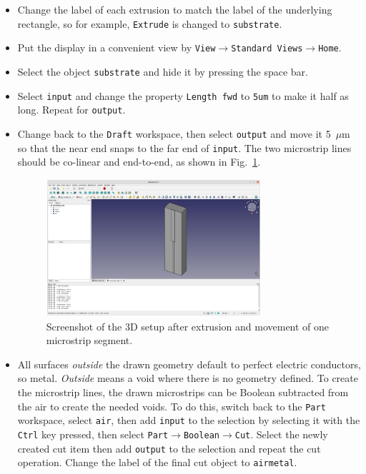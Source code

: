 \documentclass[titlepage]{article}
\renewcommand\_{\textunderscore\linebreak[1]}
\begin{document}
\begin{itemize}
\item Change the label of each extrusion to match the label of the underlying rectangle, so for example, \texttt{Extrude} is changed to \texttt{substrate}.
\item Put the display in a convenient view by \texttt{View}$\rightarrow$\texttt{Standard Views}$\rightarrow$\texttt{Home}.
\item Select the object \texttt{substrate} and hide it by pressing the space bar.
\item Select \texttt{input} and change the property \texttt{Length fwd} to \texttt{5um} to make it half as long.  Repeat for \texttt{output}.
\item Change back to the \texttt{Draft} workspace, then select \texttt{output} and move it 5~$\mu$m so that the near end snaps to the far end of \texttt{input}.  The two microstrip lines should be co-linear and end-to-end, as shown in Fig.~\ref{fig:microstrip_extrusion}.
\begin{figure}
  \centering
  \includegraphics[width=0.75\textwidth]{../tutorials/OpenParEM3D/microstrip_step/screenshots/microstrip_extruded}
  \caption{Screenshot of the 3D setup after extrusion and movement of one microstrip segment.}
  \label{fig:microstrip_extrusion}
\end{figure}
\item All surfaces \textit{outside} the drawn geometry default to perfect electric conductors, so metal.  \textit{Outside} means a void where there is no geometry defined.  To create the microstrip lines, the drawn microstrips can be Boolean subtracted from the air to create the needed voids.  To do this, switch back to the \texttt{Part} workspace, select \texttt{air}, then add \texttt{input} to the selection by selecting it with the \texttt{Ctrl} key pressed, then select \texttt{Part}$\rightarrow$\texttt{Boolean}$\rightarrow$\texttt{Cut}.  Select the newly created cut item then add \texttt{output} to the selection and repeat the cut operation.  Change the label of the final cut object to \texttt{air\_metal}.

\end{itemize}
\end{document}
